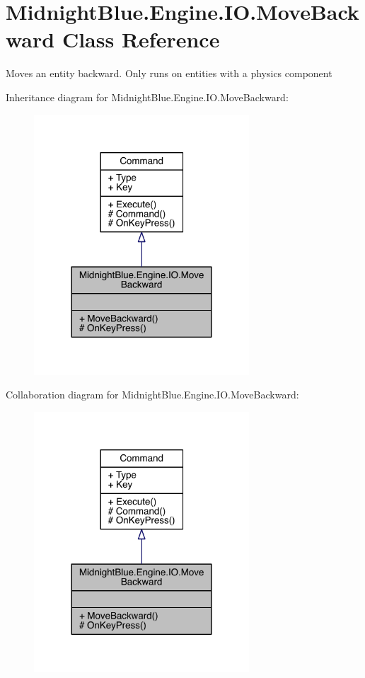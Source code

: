 \hypertarget{class_midnight_blue_1_1_engine_1_1_i_o_1_1_move_backward}{}\section{Midnight\+Blue.\+Engine.\+I\+O.\+Move\+Backward Class Reference}
\label{class_midnight_blue_1_1_engine_1_1_i_o_1_1_move_backward}


Moves an entity backward. Only runs on entities with a physics component  




Inheritance diagram for Midnight\+Blue.\+Engine.\+I\+O.\+Move\+Backward\+:
\nopagebreak
\begin{figure}[H]
\begin{center}
\leavevmode
\includegraphics[width=228pt]{class_midnight_blue_1_1_engine_1_1_i_o_1_1_move_backward__inherit__graph}
\end{center}
\end{figure}


Collaboration diagram for Midnight\+Blue.\+Engine.\+I\+O.\+Move\+Backward\+:
\nopagebreak
\begin{figure}[H]
\begin{center}
\leavevmode
\includegraphics[width=228pt]{class_midnight_blue_1_1_engine_1_1_i_o_1_1_move_backward__coll__graph}
\end{center}
\end{figure}
